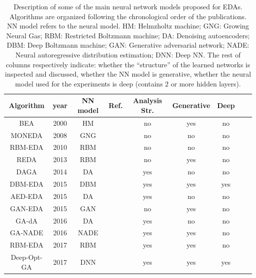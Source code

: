 \documentclass{article} %
\begin{document}
 \begin{table}[htbp]
\begin{center}
\scriptsize
\begin{tabular}{|c|c|c|c|c|c|c|c|c|}
\hline\hline
   Algorithm & year  & NN model & Ref.   & Analysis Str. & Generative & Deep \\ \hline \hline  
    BEA      &2000 & HM   & \cite{Zhang_and_Shin:2000}            & no    &  yes  & no   \\ \hline 
    MONEDA   &2008 & GNG   & \cite{Marti_et_al:2008}              & no    &  no  & no   \\ \hline 
    RBM-EDA  &2010 & RBM  &  \cite{Tang_et_al:2010}               & no    &  no   & no  \\  \hline 
    REDA     &2013 & RBM  &  \cite{Shim_et_al:2013}               & no    &  yes  & no   \\ \hline 
    DAGA     &2014 & DA   &  \cite{Churchill_et_al:2014}          & yes   &  no   & no \\        \hline     
    DBM-EDA  &2015 & DBM  &  \cite{Probst_and_Rothlauf:2015}      & yes   &  yes  & yes  \\ \hline 
    AED-EDA  &2015 & DA   &  \cite{Probst:2015a}                  & yes   &  no   & no  \\ \hline 
    GAN-EDA  &2015 & GAN  &  \cite{Probst:2015}                   & no    &  yes  & no \\ \hline 
    GA-dA    &2016 & DA   &  \cite{Churchill_et_al:2016}          & yes   &  no   & no  \\ \hline 
    GA-NADE  &2016 & NADE &  \cite{Churchill_et_al:2016}          & yes   &  yes  & no \\ \hline 
    RBM-EDA &2017 & RBM   &  \cite{Probst_et_al:2017}      & yes   &  yes  & no  \\ \hline 
    Deep-Opt-GA  &2017 & DNN   & \cite{Baluja:2017}               &  yes  &  yes  & yes \\ \hline  
\end{tabular}
\caption{Description of some of the main  neural network models proposed for EDAs. Algorithms are organized following the chronological order of the publications. NN model refers to the neural model. HM: Helmzholtz machine; GNG: Growing Neural Gas; RBM: Restricted Boltzmann machine; DA: Denoising autoencoders; DBM: Deep Boltzmann machine; GAN: Generative adversarial network; NADE: Neural autoregressive distribution estimation; DNN: Deep NN. The rest of columns respectively indicate: whether the ``structure'' of the learned networks is inspected and discussed, whether the NN model is generative, whether the neural model used for the experiments is deep (contains $2$ or more hidden layers).}
\label{tab:NN_MODELS}
\end{center}
\end{table}
\end{document}
